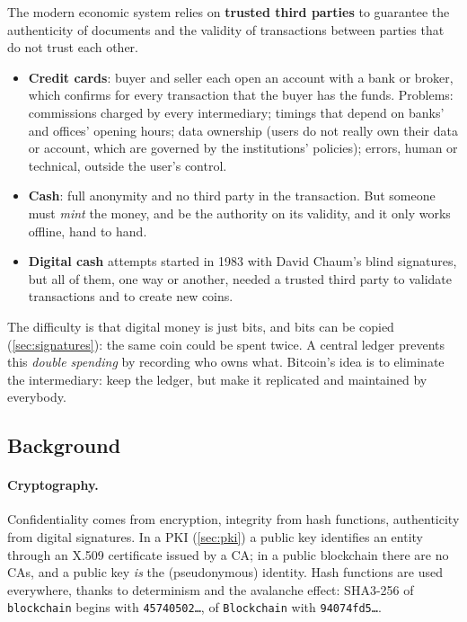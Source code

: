 The modern economic system relies on \textbf{trusted third parties} to guarantee the authenticity of documents and the validity of transactions between parties that do not trust each other.
\begin{itemize}
    \item \textbf{Credit cards}: buyer and seller each open an account with a bank or broker, which confirms for every transaction that the buyer has the funds. Problems: commissions charged by every intermediary; timings that depend on banks' and offices' opening hours; data ownership (users do not really own their data or account, which are governed by the institutions' policies); errors, human or technical, outside the user's control.
    \item \textbf{Cash}: full anonymity and no third party in the transaction. But someone must \emph{mint} the money, and be the authority on its validity, and it only works offline, hand to hand.
    \item \textbf{Digital cash} attempts started in 1983 with David Chaum's blind signatures, but all of them, one way or another, needed a trusted third party to validate transactions and to create new coins.
\end{itemize}
The difficulty is that digital money is just bits, and bits can be copied (\cref{sec:signatures}): the same coin could be spent twice. A central ledger prevents this \emph{double spending} by recording who owns what. Bitcoin's idea is to eliminate the intermediary: keep the ledger, but make it replicated and maintained by everybody.

\subsection{Background}

\paragraph{Cryptography.} Confidentiality comes from encryption, integrity from hash functions, authenticity from digital signatures. In a PKI (\cref{sec:pki}) a public key identifies an entity through an X.509 certificate issued by a CA; in a public blockchain there are no CAs, and a public key \emph{is} the (pseudonymous) identity. Hash functions are used everywhere, thanks to determinism and the avalanche effect: SHA3-256 of \texttt{blockchain} begins with \texttt{45740502\dots}, of \texttt{Blockchain} with \texttt{94074fd5\dots}.

